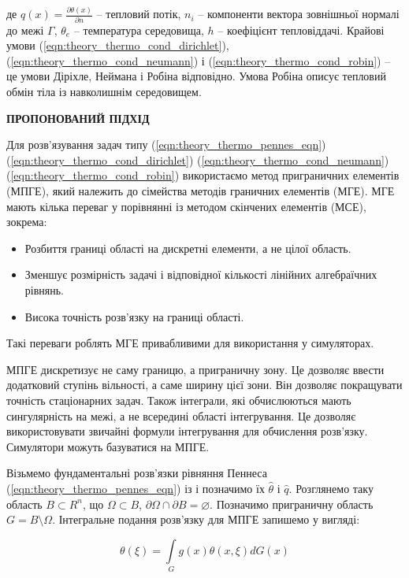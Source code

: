 \noindent де $q(x) = \frac{\partial \theta(x)}{\partial n}$ -- тепловий потік, $n_i$ -- компоненти вектора зовнішньої
нормалі до межі $\Gamma$, $\theta_e$ -- температура середовища, $h$ -- коефіцієнт тепловіддачі. Крайові умови
(\ref{eqn:theory_thermo_cond_dirichlet}), (\ref{eqn:theory_thermo_cond_neumann}) і (\ref{eqn:theory_thermo_cond_robin})
-- це умови Діріхле, Неймана і Робіна відповідно. Умова Робіна описує тепловий обмін тіла із навколишнім середовищем.

\begin{center}
  \textbf{ПРОПОНОВАНИЙ ПІДХІД}
\end{center}
Для розв'язування задач типу (\ref{eqn:theory_thermo_pennes_eqn}) (\ref{eqn:theory_thermo_cond_dirichlet})
(\ref{eqn:theory_thermo_cond_neumann}) (\ref{eqn:theory_thermo_cond_robin}) використаємо метод приграничних елементів
(МПГЕ)\cite{grytsko-cobem}, який належить до сімейства методів граничних елементів (МГЕ)\cite{brebbia-bem}. МГЕ мають
кілька переваг у порівнянні із методом скінчених елементів (МСЕ)\cite{bahvalov-et-al}, зокрема:
\begin{itemize}
  \item Розбиття границі області на дискретні елементи, а не цілої область.
  \item Зменшує розмірність задачі і відповідної кількості лінійних алгебраїчних рівнянь.
  \item Висока точність розв'язку на границі області.
\end{itemize}
Такі переваги роблять МГЕ привабливими для використання у симуляторах.

МПГЕ дискретизує не саму границю, а приграничну зону. Це дозволяє ввести додатковий ступінь вільності, а саме ширину
цієї зони. Він дозволяє покращувати точність стаціонарних задач. Також інтеграли, які обчислюються мають сингулярність
на межі, а не всередині області інтегрування. Це дозволяє використовувати звичайні формули інтегрування для обчислення
розв'язку. Симулятори можуть базуватися на МПГЕ.

Візьмемо фундаментальні розв'язки рівняння Пеннеса (\ref{eqn:theory_thermo_pennes_eqn}) із
\cite{pennes-equation-bem-fundamental-solutions} і позначимо їх $\hat{\theta}$ і $\hat{q}$. Розглянемо таку область $B
  \subset R^n$, що $\Omega \subset B$, $\partial\Omega \cap \partial B = \varnothing$. Позначимо приграничну область $G =
  B \setminus \Omega$. Інтегральне подання розв'язку для МПГЕ запишемо у вигляді:

\begin{equation}
  \label{eqn:thermo_cobem_pennes_theta}
  \theta(\xi) = \int \limits_G g(x)\hat{\theta}(x,\xi)dG(x)
\end{equation}

